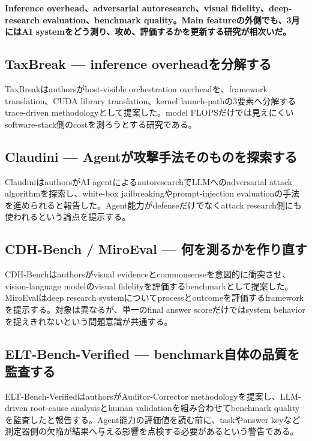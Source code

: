 \noindent\textbf{Inference overhead、adversarial autoresearch、visual fidelity、deep-research evaluation、benchmark quality。Main featureの外側でも、3月にはAI systemをどう測り、攻め、評価するかを更新する研究が相次いだ。}\autocite{src-198727200361,src-4553a7bbd23e,src-5d84874f2d03,src-a27679e5527b,src-bb83c9c55568}

\subsection{TaxBreak — inference overheadを分解する}

TaxBreakはauthorsがhost-visible orchestration overheadを、framework translation、CUDA library translation、kernel launch-pathの3要素へ分解するtrace-driven methodologyとして提案した。model FLOPSだけでは見えにくいsoftware-stack側のcostを測ろうとする研究である。\autocite{src-198727200361}


\subsection{Claudini — Agentが攻撃手法そのものを探索する}

ClaudiniはauthorsがAI agentによるautoresearchでLLMへのadversarial attack algorithmを探索し、white-box jailbreakingやprompt-injection evaluationの手法を進められると報告した。Agent能力がdefenseだけでなくattack research側にも使われるという論点を提示する。\autocite{src-bb83c9c55568}


\subsection{CDH-Bench / MiroEval — 何を測るかを作り直す}

CDH-Benchはauthorsがvisual evidenceとcommonsenseを意図的に衝突させ、vision-language modelのvisual fidelityを評価するbenchmarkとして提案した。MiroEvalはdeep research systemについてprocessとoutcomeを評価するframeworkを提示する。対象は異なるが、単一のfinal answer scoreだけではsystem behaviorを捉えきれないという問題意識が共通する。\autocite{src-4553a7bbd23e,src-5d84874f2d03}


\subsection{ELT-Bench-Verified — benchmark自体の品質を監査する}

ELT-Bench-VerifiedはauthorsがAuditor-Corrector methodologyを提案し、LLM-driven root-cause analysisとhuman validationを組み合わせてbenchmark qualityを監査したと報告する。Agent能力の評価値を読む前に、taskやanswer keyなど測定器側の欠陥が結果へ与える影響を点検する必要があるという警告である。\autocite{src-a27679e5527b}


